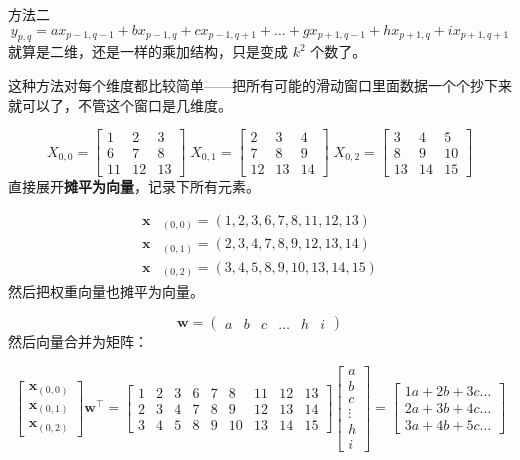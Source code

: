 \documentclass[aspectratio=169,10pt]{beamer}
\begin{document}
\begin{frame}[fragile,shrink=38]{方法二}
\[
y_{p,q} = 
 a x_{p-1,q-1} + b x_{p-1,q} + c x_{p-1,q+1} 
 + \dots 
 + g x_{p+1,q-1} + h x_{p+1,q} + i x_{p+1,q+1}
\]
就算是二维，还是一样的乘加结构，只是变成 $k^2$ 个数了。
\par
这种方法对每个维度都比较简单——把所有可能的滑动窗口里面数据一个个抄下来就可以了，不管这个窗口是几维度。
\par
\[
X_{0,0} = \begin{bmatrix}
{1} & {2} & {3} \\
6 & 7 & 8 \\
11 & 12 & 13
\end{bmatrix}\;
X_{0,1} = \begin{bmatrix}
{2} & {3} & {4} \\
7 & 8 & 9 \\
12 & 13 & 14
\end{bmatrix}\;
X_{0,2} = \begin{bmatrix}
{3} & {4} & {5} \\
8 & 9 & 10 \\
13 & 14 & 15
\end{bmatrix}
\]
直接展开\textbf{摊平为向量}，记录下所有元素。
\par
\[
\begin{aligned}
\mathbf x&_{(0,0)}=(1,2,3,6,7,8,11,12,13)\\
\mathbf x&_{(0,1)}=(2,3,4,7,8,9,12,13,14)\\
\mathbf x&_{(0,2)}=(3,4,5,8,9,10,13,14,15)
\end{aligned}
\]
然后把权重向量也摊平为向量。
\par
\[
\mathbf w = \begin{pmatrix}
a & b &c &\dots&h&i
\end{pmatrix}
\]
然后向量合并为矩阵：
\par
\[
\begin{bmatrix}
\mathbf x_{(0,0)} \\
\mathbf x_{(0,1)} \\
\mathbf x_{(0,2)}
\end{bmatrix}
\mathbf w^\top
=
\begin{bmatrix}
1 & 2 & 3 & 6 & 7 & 8 & 11 & 12 & 13 \\
2 & 3 & 4 & 7 & 8 & 9 & 12 & 13 & 14 \\
3 & 4 & 5 & 8 & 9 & 10 & 13 & 14 & 15
\end{bmatrix}
\begin{bmatrix}
a\\
b\\ 
c\\
\vdots\\
h\\
i
\end{bmatrix}
=
\begin{bmatrix}
1a+2b+3c\dots\\
2a+3b+4c\dots\\
3a+4b+5c\dots
\end{bmatrix}
\]
\end{frame}
\end{document}
